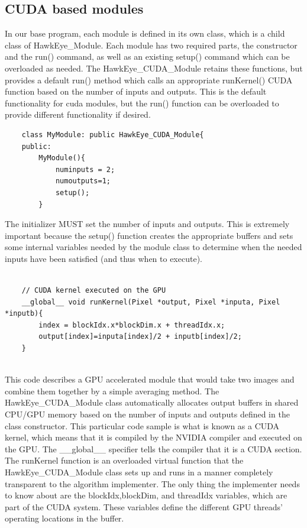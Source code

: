 \documentclass[letterpaper,10pt,titlepage]{IEEEtran}
\begin{document}
   \subsection{CUDA based modules}
\par
In our base program, each module is defined in its own class, which is a child class of HawkEye\_Module. Each module has two required parts, the constructor and the run() command, as well as an existing setup() command which can be overloaded as needed. The HawkEye\_CUDA\_Module retains these functions, but provides a default run() method which calls an appropriate runKernel() CUDA function based on the number of inputs and outputs. This is the default functionality for cuda modules, but the run() function can be overloaded to provide different functionality if desired. \\
   \begin{lstlisting}
   	class MyModule: public HawkEye_CUDA_Module{
	public:
		MyModule(){
			numinputs = 2;
			numoutputs=1;
			setup();
		}  
   \end{lstlisting}
 \par
   The initializer MUST set the number of inputs and outputs. This is extremely important because the setup() function creates the appropriate buffers and sets some internal variables needed by the module class to determine when the needed inputs have been satisfied (and thus when to execute).\\
   \begin{lstlisting}
	   
	// CUDA kernel executed on the GPU
   	__global__ void runKernel(Pixel *output, Pixel *inputa, Pixel *inputb){
	    index = blockIdx.x*blockDim.x + threadIdx.x;
		output[index]=inputa[index]/2 + inputb[index]/2;
	}
	
   \end{lstlisting}
 \par
   This code describes a GPU accelerated module that would take two images and combine them together by a simple averaging method. The HawkEye\_CUDA\_Module class automatically allocates output buffers in shared CPU/GPU memory based on the number of inputs and outputs defined in the class constructor. This particular code sample is what is known as a CUDA kernel, which means that it is compiled by the NVIDIA compiler and executed on the GPU. The \_\_global\_\_ specifier tells the compiler that it is a CUDA section. The runKernel function is an overloaded virtual function that the HawkEye\_CUDA\_Module class sets up and runs in a manner completely transparent to the algorithm implementer. The only thing the implementer needs to know about are the blockIdx,blockDim, and threadIdx variables, which are part of the CUDA system. These variables define the different GPU threads' operating locations in the buffer.   \\
\end{document}
